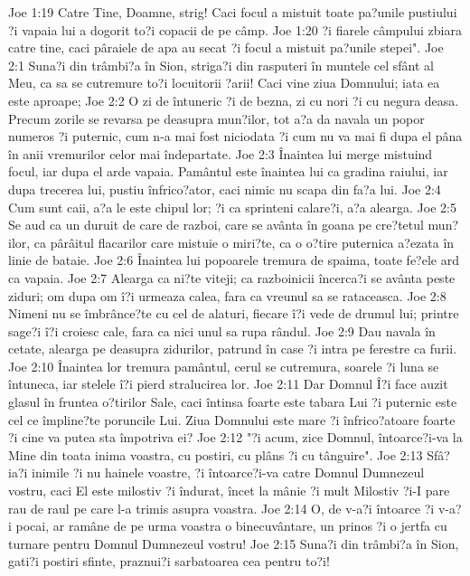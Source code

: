 Joe 1:19  Catre Tine, Doamne, strig! Caci focul a mistuit toate pa?unile pustiului ?i vapaia lui a dogorit to?i copacii de pe câmp.
Joe 1:20  ?i fiarele câmpului zbiara catre tine, caci pâraiele de apa au secat ?i focul a mistuit pa?unile stepei".
Joe 2:1  Suna?i din trâmbi?a în Sion, striga?i din rasputeri în muntele cel sfânt al Meu, ca sa se cutremure to?i locuitorii ?arii! Caci vine ziua Domnului; iata ea este aproape;
Joe 2:2  O zi de întuneric ?i de bezna, zi cu nori ?i cu negura deasa. Precum zorile se revarsa pe deasupra mun?ilor, tot a?a da navala un popor numeros ?i puternic, cum n-a mai fost niciodata ?i cum nu va mai fi dupa el pâna în anii vremurilor celor mai îndepartate.
Joe 2:3  Înaintea lui merge mistuind focul, iar dupa el arde vapaia. Pamântul este înaintea lui ca gradina raiului, iar dupa trecerea lui, pustiu înfrico?ator, caci nimic nu scapa din fa?a lui.
Joe 2:4  Cum sunt caii, a?a le este chipul lor; ?i ca sprinteni calare?i, a?a alearga.
Joe 2:5  Se aud ca un duruit de care de razboi, care se avânta în goana pe cre?tetul mun?ilor, ca pârâitul flacarilor care mistuie o miri?te, ca o o?tire puternica a?ezata în linie de bataie.
Joe 2:6  Înaintea lui popoarele tremura de spaima, toate fe?ele ard ca vapaia.
Joe 2:7  Alearga ca ni?te viteji; ca razboinicii încerca?i se avânta peste ziduri; om dupa om î?i urmeaza calea, fara ca vreunul sa se rataceasca.
Joe 2:8  Nimeni nu se îmbrânce?te cu cel de alaturi, fiecare î?i vede de drumul lui; printre sage?i î?i croiesc cale, fara ca nici unul sa rupa rândul.
Joe 2:9  Dau navala în cetate, alearga pe deasupra zidurilor, patrund în case ?i intra pe ferestre ca furii.
Joe 2:10  Înaintea lor tremura pamântul, cerul se cutremura, soarele ?i luna se întuneca, iar stelele î?i pierd stralucirea lor.
Joe 2:11  Dar Domnul Î?i face auzit glasul în fruntea o?tirilor Sale, caci întinsa foarte este tabara Lui ?i puternic este cel ce împline?te poruncile Lui. Ziua Domnului este mare ?i înfrico?atoare foarte ?i cine va putea sta împotriva ei?
Joe 2:12  "?i acum, zice Domnul, întoarce?i-va la Mine din toata inima voastra, cu postiri, cu plâns ?i cu tânguire".
Joe 2:13  Sfâ?ia?i inimile ?i nu hainele voastre, ?i întoarce?i-va catre Domnul Dumnezeul vostru, caci El este milostiv ?i îndurat, încet la mânie ?i mult Milostiv ?i-I pare rau de raul pe care l-a trimis asupra voastra.
Joe 2:14  O, de v-a?i întoarce ?i v-a?i pocai, ar ramâne de pe urma voastra o binecuvântare, un prinos ?i o jertfa cu turnare pentru Domnul Dumnezeul vostru!
Joe 2:15  Suna?i din trâmbi?a în Sion, gati?i postiri sfinte, praznui?i sarbatoarea cea pentru to?i!
